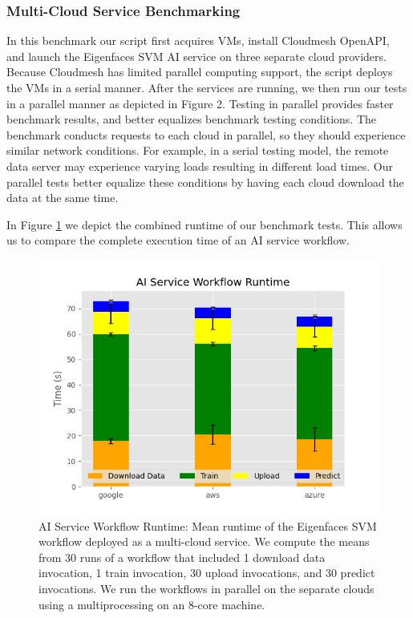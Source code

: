 \subsubsection{Multi-Cloud Service
Benchmarking}\label{multi-cloud-service-benchmarking}

In this benchmark our script first acquires VMs, install Cloudmesh
OpenAPI, and launch the Eigenfaces SVM AI service on three separate
cloud providers. Because Cloudmesh has limited parallel computing
support, the script deploys the VMs in a serial manner. After the
services are running, we then run our tests in a parallel manner as
depicted in Figure 2. Testing in parallel provides faster benchmark
results, and better equalizes benchmark testing conditions. The
benchmark conducts requests to each cloud in parallel, so they should
experience similar network conditions. For example, in a serial testing
model, the remote data server may experience varying loads resulting in
different load times. Our parallel tests better equalize these
conditions by having each cloud download the data at the same time.

In Figure \ref{fig:7} we depict the combined runtime of our benchmark tests. This
allows us to compare the complete execution time of an AI service
workflow.

\begin{figure}
\centering
\includegraphics[width=\columnwidth]{../images/ai_service_workflow_runtime.png}
\caption{AI Service Workflow Runtime: Mean runtime of the Eigenfaces SVM workflow deployed
as a multi-cloud service. We compute the means from 30 runs of a
workflow that included 1 download data invocation, 1 train invocation,
30 upload invocations, and 30 predict invocations. We run the workflows
in parallel on the separate clouds using a multiprocessing on an 8-core
machine.}
\label{fig:7}
\end{figure}

